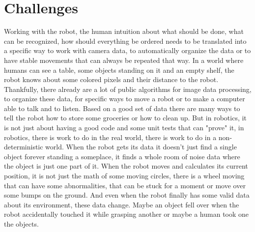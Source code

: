 \documentclass[main.tex]{subfiles}
\begin{document}
	\section{Challenges}
	\label{challanges}
	Working with the robot, the human intuition about what should be done, what can be recognized, how should everything be ordered needs to be translated into a specific way to work with camera data, to automatically organize the data or to have stable movements that can always be repeated that way. In a world where humans can see a table, some objects standing on it and an empty shelf, the robot knows about some colored pixels and their distance to the robot.\\
	Thankfully, there already are a lot of public algorithms for image data processing, to organize these data, for specific ways to move a robot or to make a computer able to talk and to listen. Based on a good set of data there are many ways to tell the robot how to store some groceries or how to clean up. But in robotics, it is not just about having a good code and some unit tests that can "prove" it, in robotics, there is work to do in the real world, there is work to do in a non-deterministic world. When the robot gets its data it doesn't just find a single object forever standing a someplace, it finds a whole room of noise data where the object is just one part of it. When the robot moves and calculates its current position, it is not just the math of some moving circles, there is a wheel moving that can have some abnormalities, that can be stuck for a moment or move over some bumps on the ground. And even when the robot finally has some valid data about its environment, these data change. Maybe an object fell over when the robot accidentally touched it while grasping another or maybe a human took one the objects.
	
\end{document}
